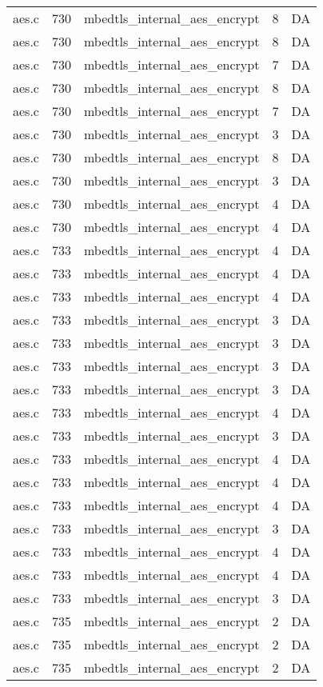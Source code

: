 \begin{table}[h]
{\begin{tabular}{clrrr}
aes.c&730&mbedtls\_internal\_aes\_encrypt&8 &DA\\
aes.c&730&mbedtls\_internal\_aes\_encrypt&8 &DA\\
aes.c&730&mbedtls\_internal\_aes\_encrypt&7 &DA\\
aes.c&730&mbedtls\_internal\_aes\_encrypt&8 &DA\\
aes.c&730&mbedtls\_internal\_aes\_encrypt&7 &DA\\
aes.c&730&mbedtls\_internal\_aes\_encrypt&3 &DA\\
aes.c&730&mbedtls\_internal\_aes\_encrypt&8 &DA\\
aes.c&730&mbedtls\_internal\_aes\_encrypt&3 &DA\\
aes.c&730&mbedtls\_internal\_aes\_encrypt&4 &DA\\
aes.c&730&mbedtls\_internal\_aes\_encrypt&4 &DA\\
aes.c&733&mbedtls\_internal\_aes\_encrypt&4 &DA\\
aes.c&733&mbedtls\_internal\_aes\_encrypt&4 &DA\\
aes.c&733&mbedtls\_internal\_aes\_encrypt&4 &DA\\
aes.c&733&mbedtls\_internal\_aes\_encrypt&3 &DA\\
aes.c&733&mbedtls\_internal\_aes\_encrypt&3 &DA\\
aes.c&733&mbedtls\_internal\_aes\_encrypt&3 &DA\\
aes.c&733&mbedtls\_internal\_aes\_encrypt&3 &DA\\
aes.c&733&mbedtls\_internal\_aes\_encrypt&4 &DA\\
aes.c&733&mbedtls\_internal\_aes\_encrypt&3 &DA\\
aes.c&733&mbedtls\_internal\_aes\_encrypt&4 &DA\\
aes.c&733&mbedtls\_internal\_aes\_encrypt&4 &DA\\
aes.c&733&mbedtls\_internal\_aes\_encrypt&4 &DA\\
aes.c&733&mbedtls\_internal\_aes\_encrypt&3 &DA\\
aes.c&733&mbedtls\_internal\_aes\_encrypt&4 &DA\\
aes.c&733&mbedtls\_internal\_aes\_encrypt&4 &DA\\
aes.c&733&mbedtls\_internal\_aes\_encrypt&3 &DA\\
aes.c&735&mbedtls\_internal\_aes\_encrypt&2 &DA\\
aes.c&735&mbedtls\_internal\_aes\_encrypt&2 &DA\\
aes.c&735&mbedtls\_internal\_aes\_encrypt&2 &DA\\

\end{tabular}}
\end{table}
